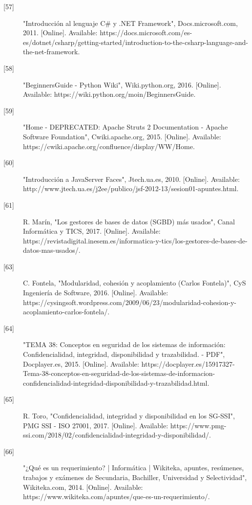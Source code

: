 \begin{description}
		\item[\hypertarget{b57}{[57]}] "Introducción al lenguaje C\# y .NET Framework", Docs.microsoft.com, 2011. [Online]. Available: https://docs.microsoft.com/es-es/dotnet/csharp/getting-started/introduction-to-the-csharp-language-and-the-net-framework.
		
		\item[\hypertarget{b58}{[58]}] "BeginnersGuide - Python Wiki", Wiki.python.org, 2016. [Online]. Available: https://wiki.python.org/moin/BeginnersGuide. 
		
		\item[\hypertarget{b59}{[59]}] "Home - DEPRECATED: Apache Struts 2 Documentation - Apache Software Foundation", Cwiki.apache.org, 2015. [Online]. Available: https://cwiki.apache.org/confluence/display/WW/Home. 
		
		\item[\hypertarget{b60}{[60]}] "Introducción a JavaServer Faces", Jtech.ua.es, 2010. [Online]. Available: http://www.jtech.ua.es/j2ee/publico/jsf-2012-13/sesion01-apuntes.html. 
		
		\item[\hypertarget{b61}{[61]}] R. Marín, "Los gestores de bases de datos (SGBD) más usados", Canal Informática y TICS, 2017. [Online]. Available: https://revistadigital.inesem.es/informatica-y-tics/los-gestores-de-bases-de-datos-mas-usados/.
		
		\item[\hypertarget{b63}{[63]}] C. Fontela, "Modularidad, cohesión y acoplamiento (Carlos Fontela)", CyS Ingeniería de Software, 2016. [Online]. Available: https://cysingsoft.wordpress.com/2009/06/23/modularidad-cohesion-y-acoplamiento-carlos-fontela/.
		
		\item[\hypertarget{b64}{[64]}] "TEMA 38: Conceptos en seguridad de los sistemas de información: Confidencialidad, integridad, disponibilidad y trazabilidad. - PDF", Docplayer.es, 2015. [Online]. Available: https://docplayer.es/15917327-Tema-38-conceptos-en-seguridad-de-los-sistemas-de-informacion-confidencialidad-integridad-disponibilidad-y-trazabilidad.html. 
		
		\item[\hypertarget{b65}{[65]}] R. Toro, "Confidencialidad, integridad y disponibilidad en los SG-SSI", PMG SSI - ISO 27001, 2017. [Online]. Available: https://www.pmg-ssi.com/2018/02/confidencialidad-integridad-y-disponibilidad/. 
		
		\item[\hypertarget{b66}{[66]}] "¿Qué es un requerimiento? | Informática | Wikiteka, apuntes, resúmenes, trabajos y exámenes de Secundaria, Bachiller, Universidad y Selectividad", Wikiteka.com, 2014. [Online]. Available: https://www.wikiteka.com/apuntes/que-es-un-requerimiento/. 
		

\end{description}
